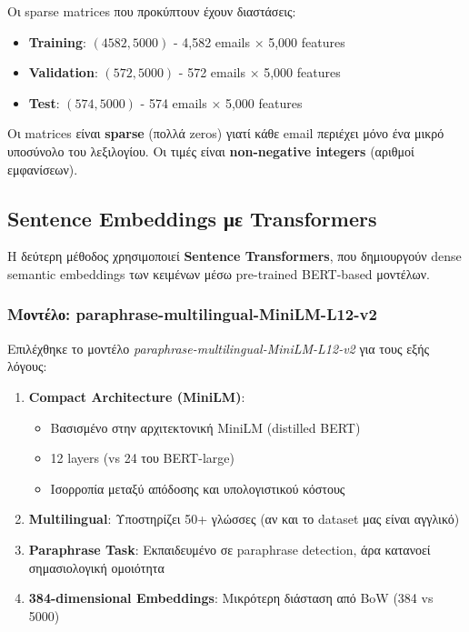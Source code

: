 \documentclass[12pt,a4paper,twoside]{book}
\begin{document}
Οι sparse matrices που προκύπτουν έχουν διαστάσεις:

\begin{itemize}
    \item \textbf{Training}: \((4582, 5000)\) - 4,582 emails × 5,000 features
    \item \textbf{Validation}: \((572, 5000)\) - 572 emails × 5,000 features
    \item \textbf{Test}: \((574, 5000)\) - 574 emails × 5,000 features
\end{itemize}

Οι matrices είναι \textbf{sparse} (πολλά zeros) γιατί κάθε email περιέχει μόνο ένα μικρό υποσύνολο του λεξιλογίου. Οι τιμές είναι \textbf{non-negative integers} (αριθμοί εμφανίσεων).

\subsection{Sentence Embeddings με Transformers}

Η δεύτερη μέθοδος χρησιμοποιεί \textbf{Sentence Transformers}, που δημιουργούν dense semantic embeddings των κειμένων μέσω pre-trained BERT-based μοντέλων.

\subsubsection*{Μοντέλο: paraphrase-multilingual-MiniLM-L12-v2}

Επιλέχθηκε το μοντέλο \textit{paraphrase-multilingual-MiniLM-L12-v2} για τους εξής λόγους:

\begin{enumerate}
    \item \textbf{Compact Architecture (MiniLM)}:
          \begin{itemize}
              \item Βασισμένο στην αρχιτεκτονική MiniLM (distilled BERT)
              \item 12 layers (vs 24 του BERT-large)
              \item Ισορροπία μεταξύ απόδοσης και υπολογιστικού κόστους
          \end{itemize}

    \item \textbf{Multilingual}: Υποστηρίζει 50+ γλώσσες (αν και το dataset μας είναι αγγλικό)

    \item \textbf{Paraphrase Task}: Εκπαιδευμένο σε paraphrase detection, άρα κατανοεί σημασιολογική ομοιότητα

    \item \textbf{384-dimensional Embeddings}: Μικρότερη διάσταση από BoW (384 vs 5000)
\end{enumerate}
\end{document}
